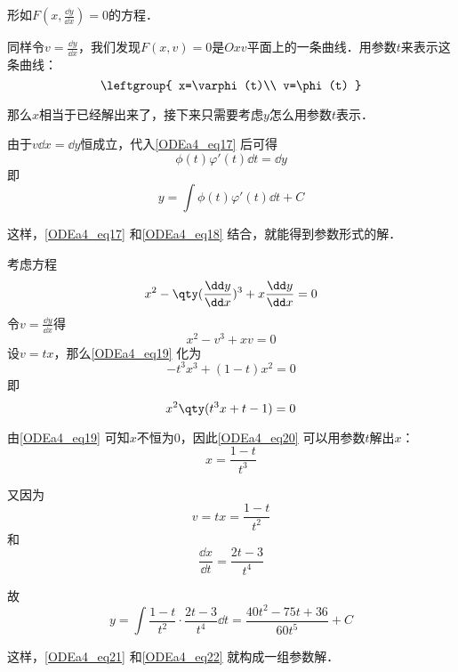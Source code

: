 形如$F(x, \frac{\dd y}{\dd x})=0$的方程．

同样令$v=\frac{\dd y}{\dd x}$，我们发现$F(x, v)=0$是$Oxv$平面上的一条曲线．用参数$t$来表示这条曲线：
\begin{equation}\label{ODEa4_eq17}
\leftgroup{
    x=\varphi(t)\\
    v=\phi(t)
}
\end{equation}

那么$x$相当于已经解出来了，接下来只需要考虑$y$怎么用参数$t$表示．

由于$v\dd x=\dd y$恒成立，代入\autoref{ODEa4_eq17} 后可得
\begin{equation}
\phi(t)\varphi'(t)\dd t=\dd y
\end{equation}
即
\begin{equation}\label{ODEa4_eq18}
y=\int \phi(t)\varphi'(t)\dd t+C
\end{equation}

这样，\autoref{ODEa4_eq17} 和\autoref{ODEa4_eq18} 结合，就能得到参数形式的解．

\begin{example}{}
考虑方程
\begin{equation}
x^2-\qty(\frac{\dd y}{\dd x})^3+x\frac{\dd y}{\dd x}=0
\end{equation}
令$v=\frac{\dd y}{\dd x}$得
\begin{equation}\label{ODEa4_eq19}
x^2-v^3+xv=0
\end{equation}
设$v=tx$，那么\autoref{ODEa4_eq19} 化为
\begin{equation}
-t^3x^3+(1-t)x^2=0
\end{equation}
即
\begin{equation}\label{ODEa4_eq20}
x^2\qty(t^3x+t-1)=0
\end{equation}

由\autoref{ODEa4_eq19} 可知$x$不恒为$0$，因此\autoref{ODEa4_eq20} 可以用参数$t$解出$x$：
\begin{equation}\label{ODEa4_eq21}
x=\frac{1-t}{t^3}
\end{equation}

又因为
\begin{equation}
v=tx=\frac{1-t}{t^2}
\end{equation}
和
\begin{equation}
\frac{\dd x}{\dd t}=\frac{2t-3}{t^4}
\end{equation}

故
\begin{equation}\label{ODEa4_eq22}
y=\int \frac{1-t}{t^2}\cdot\frac{2t-3}{t^4}\dd t=\frac{40t^2-75t+36}{60t^5}+C
\end{equation}

这样，\autoref{ODEa4_eq21} 和\autoref{ODEa4_eq22} 就构成一组参数解．



\end{example}




